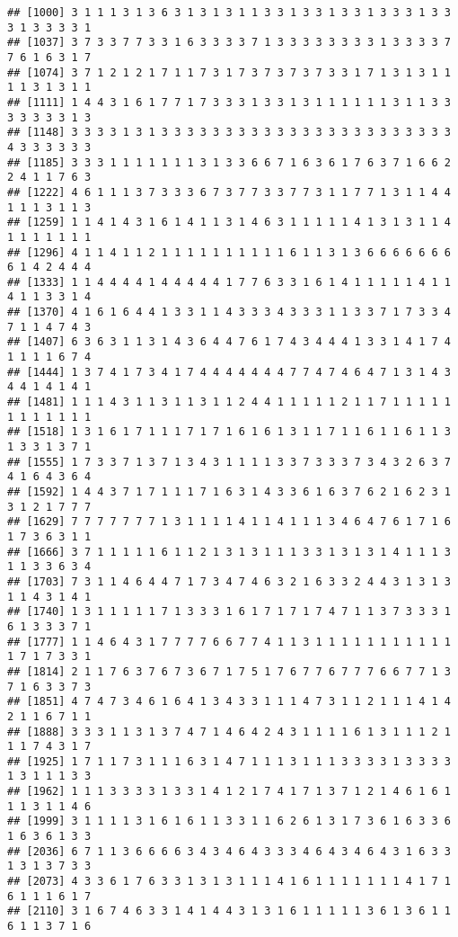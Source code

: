 \documentclass[
]{article}
\begin{document}
\begin{verbatim}
## [1000] 3 1 1 1 3 1 3 6 3 1 3 1 3 1 1 3 3 1 3 3 1 3 3 1 3 3 3 1 3 3 3 1 3 3 3 3 1
## [1037] 3 7 3 3 7 7 3 3 1 6 3 3 3 3 7 1 3 3 3 3 3 3 3 3 1 3 3 3 3 7 7 6 1 6 3 1 7
## [1074] 3 7 1 2 1 2 1 7 1 1 7 3 1 7 3 7 3 7 3 7 3 3 1 7 1 3 1 3 1 1 1 1 3 1 3 1 1
## [1111] 1 4 4 3 1 6 1 7 7 1 7 3 3 3 1 3 3 1 3 1 1 1 1 1 1 3 1 1 3 3 3 3 3 3 3 1 3
## [1148] 3 3 3 3 1 3 1 3 3 3 3 3 3 3 3 3 3 3 3 3 3 3 3 3 3 3 3 3 3 3 4 3 3 3 3 3 3
## [1185] 3 3 3 1 1 1 1 1 1 1 3 1 3 3 6 6 7 1 6 3 6 1 7 6 3 7 1 6 6 2 2 4 1 1 7 6 3
## [1222] 4 6 1 1 1 3 7 3 3 3 6 7 3 7 7 3 3 7 7 3 1 1 7 7 1 3 1 1 4 4 1 1 1 3 1 1 3
## [1259] 1 1 4 1 4 3 1 6 1 4 1 1 3 1 4 6 3 1 1 1 1 1 4 1 3 1 3 1 1 4 1 1 1 1 1 1 1
## [1296] 4 1 1 4 1 1 2 1 1 1 1 1 1 1 1 1 1 6 1 1 3 1 3 6 6 6 6 6 6 6 6 1 4 2 4 4 4
## [1333] 1 1 4 4 4 4 1 4 4 4 4 4 1 7 7 6 3 3 1 6 1 4 1 1 1 1 1 4 1 1 4 1 1 3 3 1 4
## [1370] 4 1 6 1 6 4 4 1 3 3 1 1 4 3 3 3 4 3 3 3 1 1 3 3 7 1 7 3 3 4 7 1 1 4 7 4 3
## [1407] 6 3 6 3 1 1 3 1 4 3 6 4 4 7 6 1 7 4 3 4 4 4 1 3 3 1 4 1 7 4 1 1 1 1 6 7 4
## [1444] 1 3 7 4 1 7 3 4 1 7 4 4 4 4 4 4 4 7 7 4 7 4 6 4 7 1 3 1 4 3 4 4 1 4 1 4 1
## [1481] 1 1 1 4 3 1 1 3 1 1 3 1 1 2 4 4 1 1 1 1 1 2 1 1 7 1 1 1 1 1 1 1 1 1 1 1 1
## [1518] 1 3 1 6 1 7 1 1 1 7 1 7 1 6 1 6 1 3 1 1 7 1 1 6 1 1 6 1 1 3 1 3 3 1 3 7 1
## [1555] 1 7 3 3 7 1 3 7 1 3 4 3 1 1 1 1 3 3 7 3 3 3 7 3 4 3 2 6 3 7 4 1 6 4 3 6 4
## [1592] 1 4 4 3 7 1 7 1 1 1 7 1 6 3 1 4 3 3 6 1 6 3 7 6 2 1 6 2 3 1 3 1 2 1 7 7 7
## [1629] 7 7 7 7 7 7 7 1 3 1 1 1 1 4 1 1 4 1 1 1 3 4 6 4 7 6 1 7 1 6 1 7 3 6 3 1 1
## [1666] 3 7 1 1 1 1 1 6 1 1 2 1 3 1 3 1 1 1 3 3 1 3 1 3 1 4 1 1 1 3 1 1 3 3 6 3 4
## [1703] 7 3 1 1 4 6 4 4 7 1 7 3 4 7 4 6 3 2 1 6 3 3 2 4 4 3 1 3 1 3 1 1 4 3 1 4 1
## [1740] 1 3 1 1 1 1 1 7 1 3 3 3 1 6 1 7 1 7 1 7 4 7 1 1 3 7 3 3 3 1 6 1 3 3 3 7 1
## [1777] 1 1 4 6 4 3 1 7 7 7 7 6 6 7 7 4 1 1 3 1 1 1 1 1 1 1 1 1 1 1 1 7 1 7 3 3 1
## [1814] 2 1 1 7 6 3 7 6 7 3 6 7 1 7 5 1 7 6 7 7 6 7 7 7 6 6 7 7 1 3 7 1 6 3 3 7 3
## [1851] 4 7 4 7 3 4 6 1 6 4 1 3 4 3 3 1 1 1 4 7 3 1 1 2 1 1 1 4 1 4 2 1 1 6 7 1 1
## [1888] 3 3 3 1 1 3 1 3 7 4 7 1 4 6 4 2 4 3 1 1 1 1 6 1 3 1 1 1 2 1 1 1 7 4 3 1 7
## [1925] 1 7 1 1 7 3 1 1 1 6 3 1 4 7 1 1 1 3 1 1 1 3 3 3 3 1 3 3 3 3 1 3 1 1 1 3 3
## [1962] 1 1 1 3 3 3 3 1 3 3 1 4 1 2 1 7 4 1 7 1 3 7 1 2 1 4 6 1 6 1 1 1 3 1 1 4 6
## [1999] 3 1 1 1 1 3 1 6 1 6 1 1 3 3 1 1 6 2 6 1 3 1 7 3 6 1 6 3 3 6 1 6 3 6 1 3 3
## [2036] 6 7 1 1 3 6 6 6 6 3 4 3 4 6 4 3 3 3 4 6 4 3 4 6 4 3 1 6 3 3 1 3 1 3 7 3 3
## [2073] 4 3 3 6 1 7 6 3 3 1 3 1 3 1 1 1 4 1 6 1 1 1 1 1 1 1 4 1 7 1 6 1 1 1 6 1 7
## [2110] 3 1 6 7 4 6 3 3 1 4 1 4 4 3 1 3 1 6 1 1 1 1 1 3 6 1 3 6 1 1 6 1 1 3 7 1 6

\end{verbatim}
\end{document}
